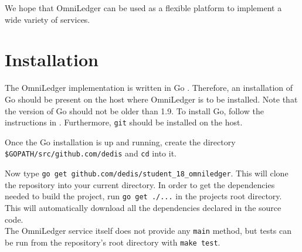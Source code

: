 \documentclass[11pt, a4paper, twoside, openright]{article} %
\begin{document}
We hope that OmniLedger can be used as a flexible platform to implement a wide
variety of services.

\appendix
\section{Installation}
The OmniLedger implementation is written in Go \cite{golang}. Therefore, an
installation of Go should be present on the host where OmniLedger is to be
installed. Note that the version of Go should not be older than 1.9.
To install Go, follow the instructions in \cite{goinstall}.
Furthermore, \texttt{git} should be installed on the host.

Once the Go installation is up and running, create the directory\\
\texttt{\$GOPATH/src/github.com/dedis}
and \texttt{cd} into it.

Now type \texttt{go get github.com/dedis/student\_18\_omniledger}.
This will clone the repository into your current directory.
In order to get the dependencies needed to build the project, run
\texttt{go get ./...} in the projects root directory.
This will automatically download all the dependencies declared in the source
code.\\

The OmniLedger service itself does not provide any \texttt{main} method, but
tests can be run from the repository's root directory with \texttt{make test}.




\end{document}

